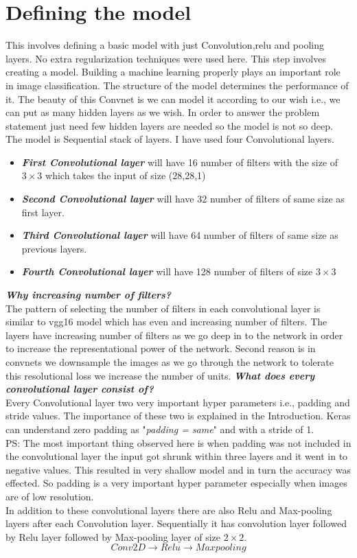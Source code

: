 \section{Defining the model}
This involves defining a basic model with just Convolution,relu and pooling layers. No extra regularization techniques were used here.
This step involves creating a model. Building a machine learning properly plays an important role in image classification. The structure of the model determines the performance of it. The beauty of this Convnet is we can model it according to our wish i.e., we can put as many hidden layers as we wish. In order to answer the problem statement just need few hidden layers are needed so the model is not so deep.
The model is Sequential stack of layers. I have used four Convolutional layers.
\begin{itemize}
    \item \textit{\textbf{First Convolutional layer}} will have 16 number of filters with the size of $3\times3$ which takes the input of size (28,28,1)
    \item \textit{\textbf{Second Convolutional layer}} will have 32 number of filters of same size as first layer.
    \item \textit{\textbf{Third Convolutional layer}} will have 64 number of filters of same size as previous layers.
    \item \textit{\textbf{Fourth Convolutional layer}} will have 128 number of filters of size $3\times3$ 
    \end{itemize}
\textbf{\textit{Why increasing number of filters? }}\\
The pattern of selecting the number of filters in each convolutional layer is similar to vgg16 model which has even and increasing number of filters. The layers have increasing number of filters as we go deep in to the network in order to increase the representational power of the network. Second reason is in convnets we downsample the images as we go through the network to tolerate this resolutional loss we increase the number of units. 
 \textbf{\textit{What does every convolutional layer consist of? }}\\
 Every Convolutional layer two very important hyper parameters i.e., padding and stride values. The importance of these two is explained in the Introduction. Keras can understand zero padding as "\textit{padding = same}" and with a stride of 1. \\
  PS: The most important thing observed here is when padding was not included in the convolutional layer the input got shrunk within three layers and it went in to negative values. This resulted in very shallow model and in turn the accuracy was effected. So padding is a very important hyper parameter especially when images are of low resolution. \\
  In addition to these convolutional layers there are also Relu and Max-pooling layers after each Convolution layer. Sequentially it has convolution layer followed by Relu layer followed by Max-pooling layer of size $2\times 2$.\\
  $$Conv2D\rightarrow Relu \rightarrow Maxpooling$$
  
